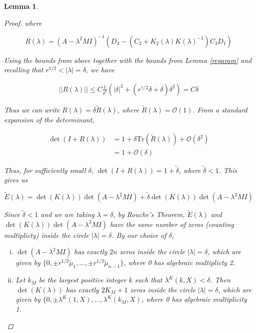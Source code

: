 \documentclass[12pt]{article}
\newtheorem{lemma}{Lemma}
\begin{document}
\begin{lemma}
\begin{proof}
where

\[
R(\lambda) = 
(A - \lambda^2 MI)^{-1}(D_2 - (C_2 + K_2(\lambda)K(\lambda)^{-1})C_3 D_1)
\]

Using the bounds from above together with the bounds from Lemma \ref{reparam} and recalling that $r^{1/2} < |\lambda| = \delta$, we have

\begin{align*}
||R(\lambda)|| \leq C \frac{1}{\delta^2}
( |\delta|^3 + (r^{\tilde{\gamma}/2}\delta + \delta)\delta^2) = C \delta
\end{align*}

Thus we can write $R(\lambda) = \delta \tilde{R}(\lambda)$, where $\tilde{R}(\lambda) = \mathcal{O}(1)$. From a standard expansion of the determinant, 

\begin{align*}
\det(I + R(\lambda)) &= 1 + \delta \text{Tr}(\tilde{R}(\lambda)) + \mathcal{O}(\delta^2) \\
&= 1 + \mathcal{O}(\delta)
\end{align*}

Thus, for sufficiently small $\delta$, $\det(I + R(\lambda)) = 1 + \tilde{\delta}$, where $\tilde{\delta} < 1$. This gives us 

\begin{equation}
\tilde{E}(\lambda) = \det(K(\lambda))\det(A - \lambda^2 MI) + \tilde{\delta} \det(K(\lambda))\det(A - \lambda^2 MI)
\end{equation}

Since $\tilde{\delta} < 1$ and we are taking $\lambda = \delta$, by Rouche's Theorem, $\tilde{E}(\lambda)$ and $\det(K(\lambda))\det(A - \lambda^2 MI)$ have the same number of zeros (counting multiplicty) inside the circle $|\lambda| = \delta$. By our choice of $\delta$, 

\begin{enumerate}[(i)]
\item $\det(A - \lambda^2 MI)$ has exactly $2n$ zeros inside the circle $|\lambda| = \delta$, which are given by $\{ 0, \pm r^{1/2} \tilde{\mu}_1, \dots, \pm r^{1/2} \tilde{\mu}_{n-1} \}$, where 0 has algebraic multiplicty 2.

\item Let $k_M$ be the largest positive integer $k$ such that $\lambda^K(k,X) < \delta$. Then $\det(K(\lambda))$ has exactly $2 K_M + 1$ zeros inside the circle $|\lambda| = \delta$, which are given by $\{0, \pm \lambda^K(1,X), \dots, \lambda^K(k_M,X)$, where 0 has algebraic multiplicity 1.
\end{enumerate}


\end{proof}
\end{lemma}
\end{document}
